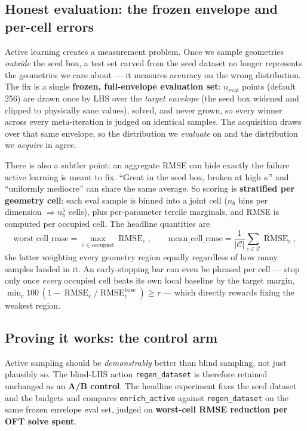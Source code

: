 \documentclass[11pt]{article}
\DeclareMathOperator{\RMSE}{RMSE}
\begin{document}
\subsection{Honest evaluation: the frozen envelope and per-cell errors}
Active learning creates a measurement problem. Once we sample geometries \emph{outside} the seed
box, a test set carved from the seed dataset no longer represents the geometries we care about ---
it measures accuracy on the wrong distribution. The fix is a single \textbf{frozen, full-envelope
evaluation set}: $n_{\text{eval}}$ points (default 256) are drawn once by LHS over the \emph{target
envelope} (the seed box widened and clipped to physically sane values), solved, and never grown, so
every winner across every meta-iteration is judged on identical samples. The acquisition draws over
that same envelope, so the distribution we \emph{evaluate} on and the distribution we \emph{acquire}
in agree.

There is also a subtler point: an aggregate RMSE can hide exactly the failure active learning is
meant to fix. ``Great in the seed box, broken at high $\kappa$'' and ``uniformly mediocre'' can
share the same average. So scoring is \textbf{stratified per geometry cell}: each eval sample is
binned into a joint cell ($n_b$ bins per dimension $\Rightarrow n_b^5$ cells), plus per-parameter
tercile marginals, and RMSE is computed per occupied cell. The headline quantities are
\begin{equation}
\text{worst\_cell\_rmse}=\max_{c\in\text{occupied}}\RMSE_c,\qquad
\text{mean\_cell\_rmse}=\frac{1}{|\mathcal{C}|}\sum_{c\in\mathcal{C}}\RMSE_c,
\end{equation}
the latter weighting every geometry region equally regardless of how many samples landed in it. An
early-stopping bar can even be phrased per cell --- stop only once \emph{every} occupied cell beats
its own local baseline by the target margin, $\min_c 100\,(1-\RMSE_c/\RMSE_c^{\text{base}})\ge\tau$
--- which directly rewards fixing the weakest region.

\subsection{Proving it works: the control arm}
Active sampling should be \emph{demonstrably} better than blind sampling, not just plausibly so.
The blind-LHS action \texttt{regen\_dataset} is therefore retained unchanged as an \textbf{A/B
control}. The headline experiment fixes the seed dataset and the budgets and compares
\texttt{enrich\_active} against \texttt{regen\_dataset} on the same frozen envelope eval set, judged
on \textbf{worst-cell RMSE reduction per OFT solve spent}.
\end{document}
